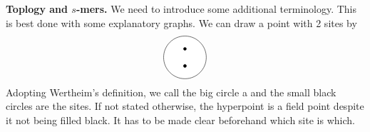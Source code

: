 \documentclass[8.5pt,twoside,twocolumn]{article}
\theoremstyle{standard}
\begin{document}
\textbf{Toplogy and $s$-mers.} We need to introduce some additional terminology. This is best done
with some explanatory graphs. We can draw a point with 2 sites by
\begin{equation}
\begin{tikzpicture}[baseline={(current bounding box.center)}]
  \draw(0,0) node[circle,minimum size=1.5cm,fill=white,draw] (1) {};
  \draw(0,.3) node[circle,inner sep=0cm,minimum size=.1cm,fill=black,draw] (1A) {};
  \draw(0,-.3) node[circle,inner sep=0cm,minimum size=.1cm,fill=black,draw] (1B) {.};
\end{tikzpicture}
\end{equation}
Adopting Wertheim's definition, we call the big circle a  and the small
black circles are the sites. If not stated otherwise, the hyperpoint is a field point
despite it not being filled black. It has to be made clear beforehand which site is which.
\end{document}
